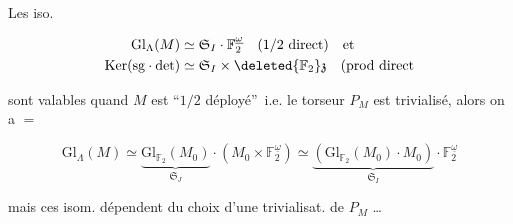 Les iso.

\[
\begin{aligned}
\mathrm{Gl}_{\Lambda}(M)&\simeq\mathfrak S_I\cdot\mathbb F_2^{\underline\omega}\quad(1/2\text{ direct})\quad\text{et}\\
\mathrm{Ker}(\mathrm{sg}\cdot\det)&\simeq\mathfrak S_I\times\deleted{\mathbb F_2}\mathfrak z\quad(\text{prod direct}
\end{aligned}
\]

sont valables quand $M$ est \textquotedblleft $1/2$ déployé\textquotedblright\ i.e. le torseur $P_M$ est trivialisé, alors on a $=$

\[
\mathrm{Gl}_{\Lambda}(M)\simeq
\underbrace{\mathrm{Gl}_{\mathbb F_2}(M_0)}_{\mathfrak S_J}\cdot(M_0\times\mathbb F_2^{\underline\omega})
\simeq\underbrace{(\mathrm{Gl}_{\mathbb F_2}(M_0)\cdot M_0)}_{\mathfrak S_I}\cdot\mathbb F_2^{\underline\omega}
\]

mais ces isom. dépendent du choix d'une trivialisat. de $P_M$ \ldots
